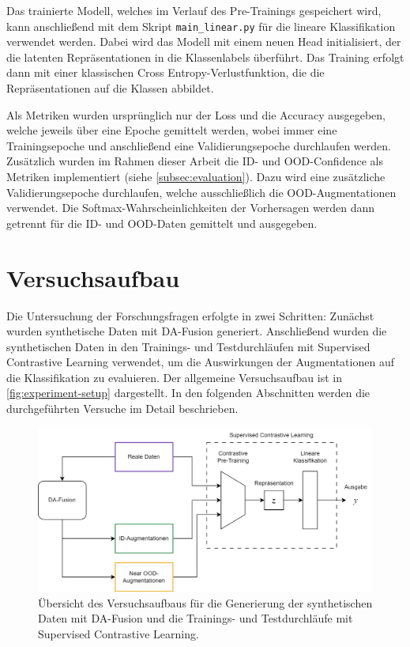 Das trainierte Modell, welches im Verlauf des Pre-Trainings gespeichert wird, kann anschließend mit dem Skript \lstinline{main_linear.py} für die lineare Klassifikation verwendet werden. Dabei wird das Modell mit einem neuen Head initialisiert, der die latenten Repräsentationen in die Klassenlabels überführt. Das Training erfolgt dann mit einer klassischen Cross Entropy-Verlustfunktion, die die Repräsentationen auf die Klassen abbildet.

Als Metriken wurden ursprünglich nur der Loss und die Accuracy ausgegeben, welche jeweils über eine Epoche gemittelt werden, wobei immer eine Trainingsepoche und anschließend eine Validierungsepoche durchlaufen werden. Zusätzlich wurden im Rahmen dieser Arbeit die ID- und OOD-Confidence als Metriken implementiert (siehe \autoref{subsec:evaluation}). Dazu wird eine zusätzliche Validierungsepoche durchlaufen, welche ausschließlich die OOD-Augmentationen verwendet. Die Softmax-Wahrscheinlichkeiten der Vorhersagen werden dann getrennt für die ID- und OOD-Daten gemittelt und ausgegeben.

\section{Versuchsaufbau} \label{sec:experiment-setup}

Die Untersuchung der Forschungsfragen erfolgte in zwei Schritten: Zunächst wurden synthetische Daten mit DA-Fusion generiert. Anschließend wurden die synthetischen Daten in den Trainings- und Testdurchläufen mit Supervised Contrastive Learning verwendet, um die Auswirkungen der Augmentationen auf die Klassifikation zu evaluieren. Der allgemeine Versuchsaufbau ist in \autoref{fig:experiment-setup} dargestellt. In den folgenden Abschnitten werden die durchgeführten Versuche im Detail beschrieben.

\begin{figure}
	\centering
	\includegraphics[width=\textwidth]{images/figure_flowchart.png}
	\caption{Übersicht des Versuchsaufbaus für die Generierung der synthetischen Daten mit DA-Fusion und die Trainings- und Testdurchläufe mit Supervised Contrastive Learning.}
	\label{fig:experiment-setup}
\end{figure}

